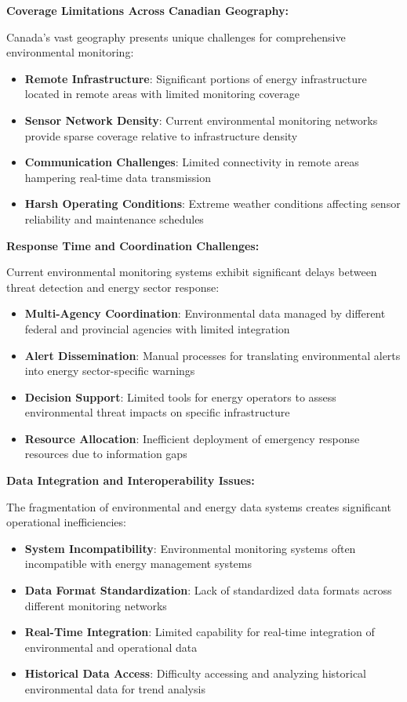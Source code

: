 \textbf{Coverage Limitations Across Canadian Geography:}

Canada's vast geography presents unique challenges for comprehensive environmental monitoring:

\begin{itemize}
    \item \textbf{Remote Infrastructure}: Significant portions of energy infrastructure located in remote areas with limited monitoring coverage
    \item \textbf{Sensor Network Density}: Current environmental monitoring networks provide sparse coverage relative to infrastructure density
    \item \textbf{Communication Challenges}: Limited connectivity in remote areas hampering real-time data transmission
    \item \textbf{Harsh Operating Conditions}: Extreme weather conditions affecting sensor reliability and maintenance schedules
\end{itemize}

\textbf{Response Time and Coordination Challenges:}

Current environmental monitoring systems exhibit significant delays between threat detection and energy sector response:

\begin{itemize}
    \item \textbf{Multi-Agency Coordination}: Environmental data managed by different federal and provincial agencies with limited integration
    \item \textbf{Alert Dissemination}: Manual processes for translating environmental alerts into energy sector-specific warnings
    \item \textbf{Decision Support}: Limited tools for energy operators to assess environmental threat impacts on specific infrastructure
    \item \textbf{Resource Allocation}: Inefficient deployment of emergency response resources due to information gaps
\end{itemize}

\textbf{Data Integration and Interoperability Issues:}

The fragmentation of environmental and energy data systems creates significant operational inefficiencies:

\begin{itemize}
    \item \textbf{System Incompatibility}: Environmental monitoring systems often incompatible with energy management systems
    \item \textbf{Data Format Standardization}: Lack of standardized data formats across different monitoring networks
    \item \textbf{Real-Time Integration}: Limited capability for real-time integration of environmental and operational data
    \item \textbf{Historical Data Access}: Difficulty accessing and analyzing historical environmental data for trend analysis
\end{itemize}

